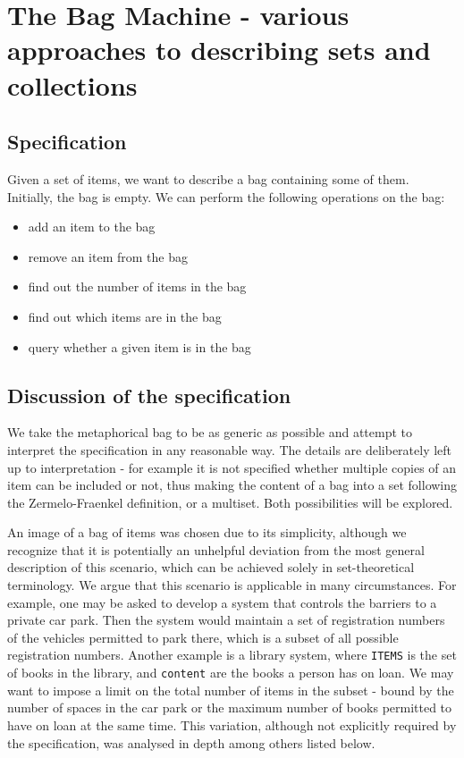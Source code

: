 \documentclass[11pt,journal]{IEEEtran}
\begin{document}
	\section{The Bag Machine - various approaches to describing sets and collections}
	\subsection{Specification}
	Given a set of items, we want to describe a bag containing some of them. Initially, the bag is empty. We can perform the following operations on the bag:
	\begin{itemize}
		\item add an item to the bag
		\item remove an item from the bag
		\item find out the number of items in the bag
		\item find out which items are in the bag
		\item query whether a given item is in the bag
	\end{itemize}
	\subsection{Discussion of the specification}
	We take the metaphorical bag to be as generic as possible and attempt to interpret the specification in any reasonable way. The details are deliberately left up to interpretation - for example it is not specified whether multiple copies of an item can be included or not, thus making the content of a bag into a set following the Zermelo-Fraenkel definition, or a multiset. Both possibilities will be explored.
	
	An image of a bag of items was chosen due to its simplicity, although we recognize that it is potentially an unhelpful deviation from the most general description of this scenario, which can be achieved solely in set-theoretical terminology. We argue that this scenario is applicable in many circumstances. For example, one may be asked to develop a system that controls the barriers to a private car park. Then the system would maintain a set of registration numbers of the vehicles permitted to park there, which is a subset of all possible registration numbers. Another example is a library system, where \texttt{ITEMS} is the set of books in the library, and \texttt{content} are the books a person has on loan. We may want to impose a limit on the total number of items in the subset - bound by the number of spaces in the car park or the maximum number of books permitted to have on loan at the same time. This variation, although not explicitly required by the specification, was analysed in depth among others listed below.
	
\end{document}
